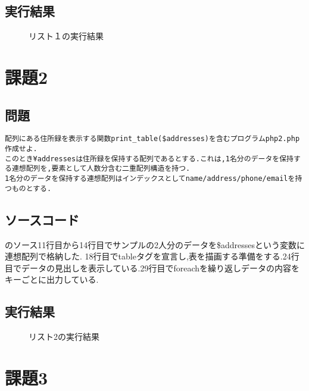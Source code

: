 \documentclass[a4j,10pt]{jsarticle}
\begin{document}
\subsection{実行結果}

\begin{figure}[H]
  \centering
  \caption{リスト１の実行結果}
  \label{fig:boat1}
\end{figure}

\section{課題2}
\subsection{問題}

\begin{verbatim}
配列にある住所録を表示する関数print_table($addresses)を含むプログラムphp2.php作成せよ.
このとき¥addressesは住所録を保持する配列であるとする.これは,1名分のデータを保持する連想配列を,要素として人数分含む二重配列構造を持つ.
1名分のデータを保持する連想配列はインデックスとしてname/address/phone/emailを持つものとする.
\end{verbatim}
\subsection{ソースコード}



のソース11行目から14行目でサンプルの2人分のデータを\$addressesという変数に連想配列で格納した.
18行目でtableタグを宣言し,表を描画する準備をする.24行目でデータの見出しを表示している.29行目でforeachを繰り返しデータの内容をキーごとに出力している.

\subsection{実行結果}

\begin{figure}[H]
  \centering
  \caption{リスト2の実行結果}
  \label{fig:boat1}
\end{figure}

\section{課題3}
\end{document}
